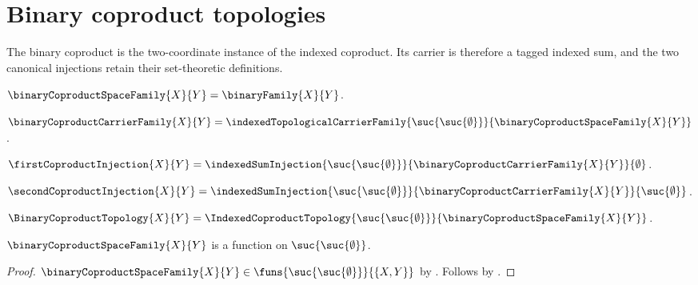 \section{Binary coproduct topologies}




The binary coproduct is the two-coordinate instance of the indexed
coproduct.  Its carrier is therefore a tagged indexed sum, and the two
canonical injections retain their set-theoretic definitions.

\begin{definition}\label{binary_coproduct_space_family}
    $\binaryCoproductSpaceFamily{X}{Y}=\binaryFamily{X}{Y}$.
\end{definition}

\begin{definition}\label{binary_coproduct_carrier_family}
    $\binaryCoproductCarrierFamily{X}{Y}
        =\indexedTopologicalCarrierFamily{
            \suc{\suc{\emptyset}}}{
            \binaryCoproductSpaceFamily{X}{Y}}$.
\end{definition}

\begin{definition}\label{first_coproduct_injection}
    $\firstCoproductInjection{X}{Y}
        =\indexedSumInjection{\suc{\suc{\emptyset}}}{
            \binaryCoproductCarrierFamily{X}{Y}}{\emptyset}$.
\end{definition}

\begin{definition}\label{second_coproduct_injection}
    $\secondCoproductInjection{X}{Y}
        =\indexedSumInjection{\suc{\suc{\emptyset}}}{
            \binaryCoproductCarrierFamily{X}{Y}}{\suc{\emptyset}}$.
\end{definition}

\begin{definition}\label{binary_coproduct_topology}
    $\BinaryCoproductTopology{X}{Y}
        =\IndexedCoproductTopology{
            \suc{\suc{\emptyset}}}{
            \binaryCoproductSpaceFamily{X}{Y}}$.
\end{definition}

\begin{proposition}\label{binary_coproduct_space_family_type}
    $\binaryCoproductSpaceFamily{X}{Y}$ is a function on
        $\suc{\suc{\emptyset}}$.
\end{proposition}
\begin{proof}
    $\binaryCoproductSpaceFamily{X}{Y}
        \in\funs{\suc{\suc{\emptyset}}}{\{X,Y\}}$ by
        .
    Follows by .
\end{proof}

